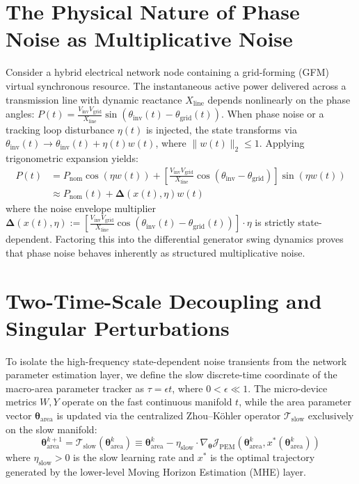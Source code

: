 \documentclass[10pt,journal,compsoc]{IEEEtran}
\begin{document}
\section{The Physical Nature of Phase Noise as Multiplicative Noise}
Consider a hybrid electrical network node containing a grid-forming (GFM) virtual synchronous resource. The instantaneous active power delivered across a transmission line with dynamic reactance $X_{\text{line}}$ depends nonlinearly on the phase angles: $P(t) = \frac{V_{\text{inv}} V_{\text{grid}}}{X_{\text{line}}} \sin(\theta_{\text{inv}}(t) - \theta_{\text{grid}}(t))$. When phase noise or a tracking loop disturbance $\eta(t)$ is injected, the state transforms via $\theta_{\text{inv}}(t) \rightarrow \theta_{\text{inv}}(t) + \eta(t) w(t)$, where $\|w(t)\|_2 \le 1$. Applying trigonometric expansion yields:
\begin{align}
    P(t) &= P_{\text{nom}} \cos(\eta w(t)) + \left[ \frac{V_{\text{inv}} V_{\text{grid}}}{X_{\text{line}}} \cos\left(\theta_{\text{inv}} - \theta_{\text{grid}}\right) \right] \sin(\eta w(t)) \nonumber \\
    &\approx P_{\text{nom}}(t) + \bm{\Delta}(x(t), \eta) w(t)
\end{align}
where the noise envelope multiplier $\bm{\Delta}(x(t), \eta) := \left[ \frac{V_{\text{inv}} V_{\text{grid}}}{X_{\text{line}}} \cos\left(\theta_{\text{inv}}(t) - \theta_{\text{grid}}(t)\right) \right] \cdot \eta$ is strictly state-dependent. Factoring this into the differential generator swing dynamics proves that phase noise behaves inherently as structured multiplicative noise.

\section{Two-Time-Scale Decoupling and Singular Perturbations}
To isolate the high-frequency state-dependent noise transients from the network parameter estimation layer, we define the slow discrete-time coordinate of the macro-area parameter tracker as $\tau = \epsilon t$, where $0 < \epsilon \ll 1$. The micro-device metrics $W, Y$ operate on the fast continuous manifold $t$, while the area parameter vector $\bm{\theta}_{\text{area}}$ is updated via the centralized Zhou--K\"ohler operator $\mathcal{T}_{\text{slow}}$ exclusively on the slow manifold:
\begin{equation}
    \bm{\theta}_{\text{area}}^{k+1} = \mathcal{T}_{\text{slow}}(\bm{\theta}_{\text{area}}^k) \equiv \bm{\theta}_{\text{area}}^k - \eta_{\text{slow}} \cdot \nabla_{\bm{\theta}} \mathcal{J}_{\text{PEM}}(\bm{\theta}_{\text{area}}^k, x^*(\bm{\theta}_{\text{area}}^k))
\end{equation}
where $\eta_{\text{slow}} > 0$ is the slow learning rate and $x^*$ is the optimal trajectory generated by the lower-level Moving Horizon Estimation (MHE) layer.
\end{document}

